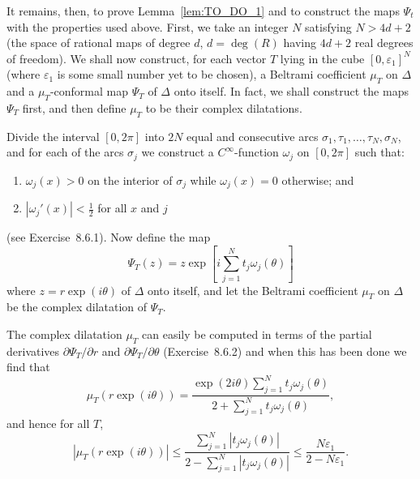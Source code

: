It remains, then, to prove Lemma~\ref{lem:TO_DO_1} and to construct the maps
$\Psi_t$ with the properties used above. First, we take an integer $N$
satisfying $N > 4d + 2$ (the space of rational maps of degree $d$, $d = \deg(R)$
having $4d + 2$ real degrees of freedom). We shall now construct, for each
vector $T$ lying in the cube $[0, \varepsilon_1]^N$ (where $\varepsilon_1$ is some
small number yet to be chosen), a Beltrami coefficient $\mu_T$ on $\Delta$ and a
$\mu_T$-conformal map $\Psi_T$ of $\Delta$ onto itself. In fact, we shall
construct the maps $\Psi_T$ first, and then define $\mu_T$ to be their complex
dilatations.

Divide the interval $[0, 2\pi]$ into $2N$ equal and consecutive arcs $\sigma_1,
\tau_1, \dots, \tau_N, \sigma_N$, and for each of the arcs $\sigma_j$ we
construct a $C^\infty$-function $\omega_j$ on $[0, 2\pi]$ such that:
\begin{enumerate}[label=(\roman*)]
    \item \label{itm:omega_j_positive_on_interior} $\omega_j(x) > 0$ on the
    interior of $\sigma_j$ while $\omega_j(x) = 0$ otherwise; and
    \item \label{itm:omega_j_derivative_bound} $|\omega_j'(x)| < \frac{1}{2}$
    for all $x$ and $j$
\end{enumerate}
(see Exercise~8.6.1). Now define the map
\begin{equation}
    \label{eq:Psi_T_definition}
    \Psi_T(z) = z \exp\left[i \sum_{j=1}^N t_j \omega_j(\theta)\right]
\end{equation}
where $z = r \exp(i\theta)$ of $\Delta$ onto itself, and let the Beltrami
coefficient $\mu_T$ on $\Delta$ be the complex dilatation of $\Psi_T$.

The complex dilatation $\mu_T$ can easily be computed in terms of the partial
derivatives $\partial\Psi_T/\partial r$ and $\partial\Psi_T/\partial\theta$
(Exercise~8.6.2) and when this has been done we find that
\begin{equation}
    \label{eq:mu_T_computation}
    \mu_T(r \exp(i\theta)) = \frac{\exp(2i\theta) \sum_{j=1}^N t_j \omega_j(\theta)}{2 + \sum_{j=1}^N t_j \omega_j(\theta)},
\end{equation}
and hence for all $T$,
\begin{equation}
    \label{eq:mu_T_bound}
    |\mu_T(r \exp(i\theta))| \leq \frac{\sum_{j=1}^N |t_j \omega_j(\theta)|}{2 - \sum_{j=1}^N |t_j \omega_j(\theta)|} \leq \frac{N\varepsilon_1}{2 - N\varepsilon_1}.
\end{equation}

